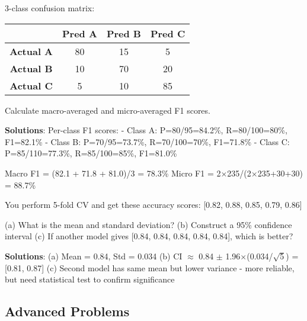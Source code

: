 \documentclass{article}
\newcounter{exercise}
\begin{document}
\begin{tcolorbox}[colback=gray!5!white,colframe=gray!75!black,title=Problem \stepcounter{exercise}\#\theexercise: Multiclass Metrics]
3-class confusion matrix:

\begin{center}
\begin{tabular}{|c|c|c|c|}
\hline
& \textbf{Pred A} & \textbf{Pred B} & \textbf{Pred C} \\
\hline
\textbf{Actual A} & 80 & 15 & 5 \\
\hline
\textbf{Actual B} & 10 & 70 & 20 \\
\hline
\textbf{Actual C} & 5 & 10 & 85 \\
\hline
\end{tabular}
\end{center}

Calculate macro-averaged and micro-averaged F1 scores.

\textbf{Solutions}:
Per-class F1 scores:
- Class A: P=80/95=84.2\%, R=80/100=80\%, F1=82.1\%
- Class B: P=70/95=73.7\%, R=70/100=70\%, F1=71.8\%
- Class C: P=85/110=77.3\%, R=85/100=85\%, F1=81.0\%

Macro F1 = (82.1 + 71.8 + 81.0)/3 = 78.3\%
Micro F1 = 2×235/(2×235+30+30) = 88.7\%
\end{tcolorbox}

\begin{tcolorbox}[colback=gray!5!white,colframe=gray!75!black,title=Problem \stepcounter{exercise}\#\theexercise: Cross-Validation Analysis]
You perform 5-fold CV and get these accuracy scores: [0.82, 0.88, 0.85, 0.79, 0.86]

(a) What is the mean and standard deviation?
(b) Construct a 95\% confidence interval
(c) If another model gives [0.84, 0.84, 0.84, 0.84, 0.84], which is better?

\textbf{Solutions}:
(a) Mean = 0.84, Std = 0.034
(b) CI $\approx$ 0.84 $\pm$ 1.96$\times$(0.034/$\sqrt{5}$) = [0.81, 0.87]
(c) Second model has same mean but lower variance - more reliable, but need statistical test to confirm significance
\end{tcolorbox}

\subsection{Advanced Problems}
\end{document}
